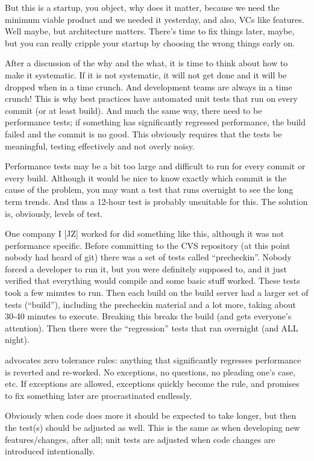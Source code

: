 \documentclass[a4paper]{report}
\begin{document}
But this is a startup, you object, why does it matter, because we need the minimum viable product and we needed it yesterday, and also, VCs like features. Well maybe, but architecture matters. There's time to fix things later, maybe, but you can really cripple your startup by choosing the wrong things early on. 

After a discussion of the why and the what, it is time to think about how to make it systematic. If it is not systematic, it will not get done and it will be dropped when in a time crunch. And development teams are always in a time crunch! This is why best practices have automated unit tests that run on every commit (or at least build). And much the same way, there need to be performance tests; if something has significantly regressed performance, the build failed and the commit is no good. This obviously requires that the tests be meaningful, testing effectively and not overly noisy. 

Performance tests may be a bit too large and difficult to run for every commit or every build. Although it would be nice to know exactly which commit is the cause of the problem, you may want a test that runs overnight to see the long term trends. And thus a 12-hour test is probably unsuitable for this. The solution is, obviously, levels of test. 

One company I [JZ] worked for did something like this, although it was not performance specific. Before committing to the CVS repository (at this point nobody had heard of git) there was a set of tests called ``precheckin''. Nobody forced a developer to run it, but you were definitely supposed to, and it just verified that everything would compile and some basic stuff worked. These tests took a few minutes to run. Then each build on the build server had a larger set of tests (``build''), including the precheckin material and a lot more, taking about 30-40 minutes to execute. Breaking this breaks the build (and gets everyone's attention). Then there were the ``regression'' tests that ran overnight (and ALL night).

\cite{perfculture} advocates zero tolerance rules: anything that significantly regresses performance is reverted and re-worked. No exceptions, no questions, no pleading one's case, etc. If exceptions are allowed, exceptions quickly become the rule, and promises to fix something later are procrastinated endlessly.

Obviously when code does more it should be expected to take longer, but then the test(s) should be adjusted as well. This is the same as when developing new features/changes, after all; unit tests are adjusted when code changes are introduced intentionally.
\end{document}
